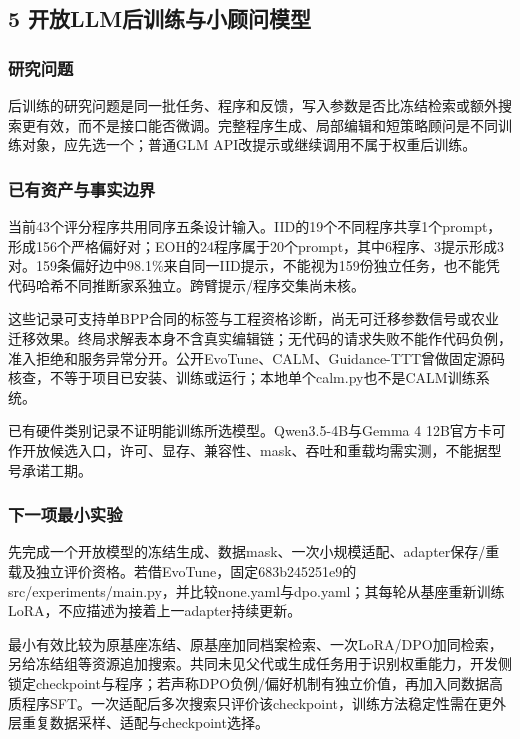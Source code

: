 \documentclass[11pt,a4paper]{article}
\newcommand{\bodytext}[1]{#1\par}
\begin{document}
\subsection{5  开放LLM后训练与小顾问模型}
\subsubsection{研究问题}
\bodytext{后训练的研究问题是同一批任务、程序和反馈，写入参数是否比冻结检索或额外搜索更有效，而不是接口能否微调。完整程序生成、局部编辑和短策略顾问是不同训练对象，应先选一个；普通GLM API改提示或继续调用不属于权重后训练。}
\subsubsection{已有资产与事实边界}
\bodytext{当前43个评分程序共用同序五条设计输入。IID的19个不同程序共享1个prompt，形成156个严格偏好对；EOH的24程序属于20个prompt，其中6程序、3提示形成3对。159条偏好边中98.1\%来自同一IID提示，不能视为159份独立任务，也不能凭代码哈希不同推断家系独立。跨臂提示/\allowbreak{}程序交集尚未核。}
\bodytext{这些记录可支持单BPP合同的标签与工程资格诊断，尚无可迁移参数信号或农业迁移效果。终局求解表本身不含真实编辑链；无代码的请求失败不能作代码负例，准入拒绝和服务异常分开。公开EvoTune、CALM、Guidance-TTT曾做固定源码核查，不等于项目已安装、训练或运行；本地单个calm.py也不是CALM训练系统。}
\bodytext{已有硬件类别记录不证明能训练所选模型。Qwen3.5-4B与Gemma 4 12B官方卡可作开放候选入口，许可、显存、兼容性、mask、吞吐和重载均需实测，不能据型号承诺工期。}
\subsubsection{下一项最小实验}
\bodytext{先完成一个开放模型的冻结生成、数据mask、一次小规模适配、adapter保存/\allowbreak{}重载及独立评价资格。若借EvoTune，固定683b245251e9的src/\allowbreak{}experiments/\allowbreak{}main.py，并比较none.yaml与dpo.yaml；其每轮从基座重新训练LoRA，不应描述为接着上一adapter持续更新。}
\bodytext{最小有效比较为原基座冻结、原基座加同档案检索、一次LoRA/\allowbreak{}DPO加同检索，另给冻结组等资源追加搜索。共同未见父代或生成任务用于识别权重能力，开发侧锁定checkpoint与程序；若声称DPO负例/\allowbreak{}偏好机制有独立价值，再加入同数据高质程序SFT。一次适配后多次搜索只评价该checkpoint，训练方法稳定性需在更外层重复数据采样、适配与checkpoint选择。}
\end{document}
